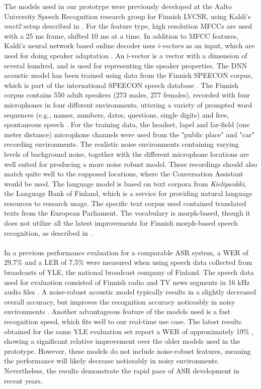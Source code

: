 \documentclass[english, 12pt, a4paper, pdftex, elec, utf8]{aaltothesis}
\begin{document}
The models used in our prototype were previously developed at the Aalto University Speech Recognition research group for Finnish LVCSR, using Kaldi's \textit{nnet2} setup described in \cite{povey2014parallel}. For the feature type, high resolution MFCCs are used with a 25 ms frame, shifted 10 ms at a time. In addition to MFCC features, Kaldi's neural network based online decoder uses \textit{i-vectors} as an input, which are used for doing speaker adaptation \cite{xiong2016achieving, kaldi}. An i-vector is a vector with a dimension of several hundred, and is used for representing the speaker properties. The DNN acoustic model has been trained using data from the Finnish SPEECON corpus, which is part of the international SPEECON speech database \cite{iskra2002speecon}. The Finnish corpus contains 550 adult speakers (273 males, 277 females), recorded with four microphones in four different environments, uttering a variety of prompted word sequences (e.g., names, numbers, dates, questions, single digits) and free, spontaneous speech \cite[p.~43]{kallasjoki2016}. For the training data, the headset, lapel and far-field (one meter distance) microphone channels were used from the "public place" and "car" recording environments. The realistic noise environments containing varying levels of background noise, together with the different microphone locations are well suited for producing a more noise robust model. These recordings should also match quite well to the supposed locations, where the Conversation Assistant would be used. The language model is based on text corpora from \textit{Kielipankki}, the Language Bank of Finland, which is a service for providing natural language resources to research usage. The specific text corpus used contained translated texts from the European Parliament. The vocabulary is morph-based, though it does not utilize all the latest improvements for Finnish morph-based speech recognition, as described in \cite{smit17boundaries, mansikka17parliament}. \\\\
In a previous performance evaluation for a comparable ASR system, a WER of 29,7\% and a LER of 7,5\% were measured when using speech data collected from broadcasts of YLE, the national broadcast company of Finland. The speech data used for evaluation consisted of Finnish radio and TV news segments in 16 kHz audio files \cite{mansikkaniemi2013unsupervised}. A noise-robust acoustic model typically results in a slightly decreased overall accuracy, but improves the recognition accuracy noticeably in noisy environments \cite{kallasjoki2016}. Another advantageous feature of the models used is a fast recognition speed, which fits well to our real-time use case. The latest results obtained for the same YLE evaluation set report a WER of approximately 19\% \cite{mansikka17parliament}, showing a significant relative improvement over the older models used in the prototype. However, these models do not include noise-robust features, meaning the performance will likely decrease noticeably in noisy environments. Nevertheless, the results demonstrate the rapid pace of ASR development in recent years. 
\end{document}
